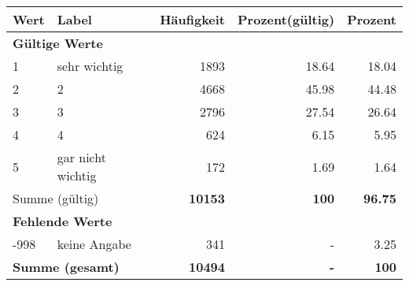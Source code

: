      \begin{longtable}{lXrrr}
     \toprule
     \textbf{Wert} & \textbf{Label} & \textbf{Häufigkeit} & \textbf{Prozent(gültig)} & \textbf{Prozent} \\
     \endhead
     \midrule
     \multicolumn{5}{l}{\textbf{Gültige Werte}}\\

     1 &
     \multicolumn{1}{X}{ sehr wichtig   } &


       \num{1893} &
       \num[round-mode=places,round-precision=2]{18,64} &
         \num[round-mode=places,round-precision=2]{18,04} \\

     2 &
     \multicolumn{1}{X}{ 2   } &


       \num{4668} &
       \num[round-mode=places,round-precision=2]{45,98} &
         \num[round-mode=places,round-precision=2]{44,48} \\

     3 &
     \multicolumn{1}{X}{ 3   } &


       \num{2796} &
       \num[round-mode=places,round-precision=2]{27,54} &
         \num[round-mode=places,round-precision=2]{26,64} \\

     4 &
     \multicolumn{1}{X}{ 4   } &


       \num{624} &
       \num[round-mode=places,round-precision=2]{6,15} &
         \num[round-mode=places,round-precision=2]{5,95} \\

     5 &
     \multicolumn{1}{X}{ gar nicht wichtig   } &


       \num{172} &
       \num[round-mode=places,round-precision=2]{1,69} &
         \num[round-mode=places,round-precision=2]{1,64} \\
     \midrule
     \multicolumn{2}{l}{Summe (gültig)} &
       \textbf{\num{10153}} &
     \textbf{100} &
       \textbf{\num[round-mode=places,round-precision=2]{96,75}} \\
     \multicolumn{5}{l}{\textbf{Fehlende Werte}}\\
       -998 &
       keine Angabe &
         \num{341} &
        - &
         \num[round-mode=places,round-precision=2]{3,25} \\
     \midrule
     \multicolumn{2}{l}{\textbf{Summe (gesamt)}} &
          \textbf{\num{10494}} &
        \textbf{-} &
        \textbf{100} \\
     \bottomrule
     \end{longtable}
     
